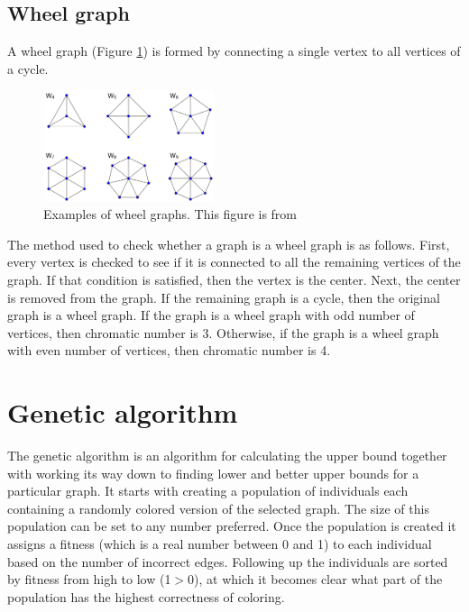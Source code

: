 \documentclass[a4paper]{report}
\begin{document}
			\subsection{Wheel graph}
			A wheel graph (Figure \ref{fig:wheel}) is formed by connecting a single vertex to all vertices of a cycle.
		
			\begin{figure}[h]
				\centering
				\includegraphics[width=50mm,scale=0.5]{figures/wheel.png}
				\caption{Examples of wheel graphs. This figure is from \protect\cite{wheelFig}}
				\label{fig:wheel}
			\end{figure}
			
			The method used to check whether a graph is a wheel graph is as follows. First, every vertex is checked to see if it is connected to all the  remaining vertices of the graph. If that condition is satisfied, then the vertex is the center. Next, the center is removed from the graph. If the remaining graph is a cycle, then the original graph is a wheel graph.
			If the graph is a wheel graph with odd number of vertices, then chromatic number is 3. Otherwise, if the graph is a wheel graph with even number of vertices, then chromatic number is 4.
			
			
		\section{Genetic algorithm}
		The genetic algorithm is an algorithm for calculating the upper bound together with working its way down to finding lower and better upper bounds for a particular graph. It starts with creating a population of individuals each containing a randomly colored version of the selected graph. The size of this population can be set to any number preferred. Once the population is created it assigns a fitness (which is a real number between 0 and 1) to each individual based on the number of incorrect edges. Following up the individuals are sorted by fitness from high to low (1$>$0), at which it becomes clear what part of the population has the highest correctness of coloring.\\
		
\end{document}
